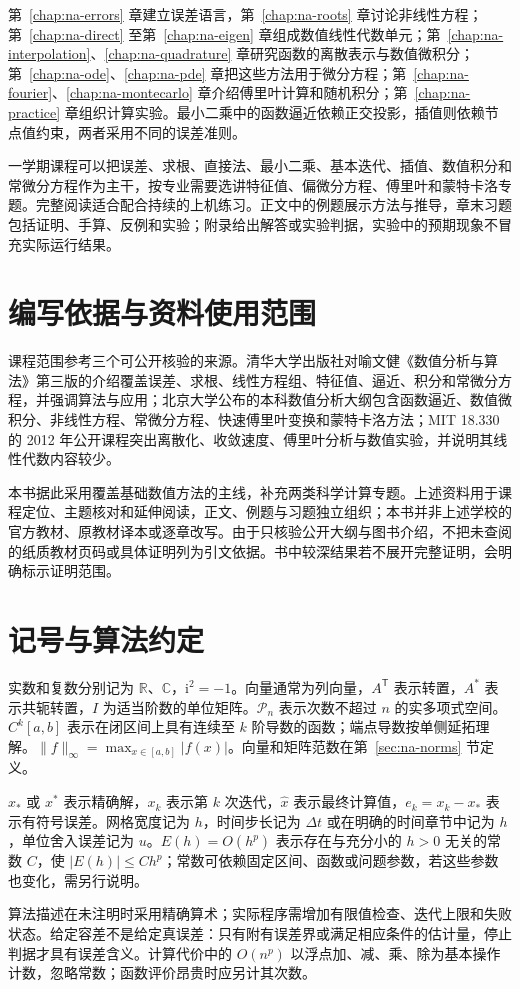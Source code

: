 第~\ref{chap:na-errors} 章建立误差语言，第~\ref{chap:na-roots} 章讨论非线性方程；第~\ref{chap:na-direct} 至第~\ref{chap:na-eigen} 章组成数值线性代数单元；第~\ref{chap:na-interpolation}、\ref{chap:na-quadrature} 章研究函数的离散表示与数值微积分；第~\ref{chap:na-ode}、\ref{chap:na-pde} 章把这些方法用于微分方程；第~\ref{chap:na-fourier}、\ref{chap:na-montecarlo} 章介绍傅里叶计算和随机积分；第~\ref{chap:na-practice} 章组织计算实验。最小二乘中的函数逼近依赖正交投影，插值则依赖节点值约束，两者采用不同的误差准则。

一学期课程可以把误差、求根、直接法、最小二乘、基本迭代、插值、数值积分和常微分方程作为主干，按专业需要选讲特征值、偏微分方程、傅里叶和蒙特卡洛专题。完整阅读适合配合持续的上机练习。正文中的例题展示方法与推导，章末习题包括证明、手算、反例和实验；附录给出解答或实验判据，实验中的预期现象不冒充实际运行结果。

\section{编写依据与资料使用范围}
课程范围参考三个可公开核验的来源。清华大学出版社对喻文健《数值分析与算法》第三版的介绍覆盖误差、求根、线性方程组、特征值、逼近、积分和常微分方程，并强调算法与应用\cite{yu2020}；北京大学公布的本科数值分析大纲包含函数逼近、数值微积分、非线性方程、常微分方程、快速傅里叶变换和蒙特卡洛方法\cite{pku-course}；MIT 18.330 的 2012 年公开课程突出离散化、收敛速度、傅里叶分析与数值实验，并说明其线性代数内容较少\cite{mit-syllabus,mit-notes}。

本书据此采用覆盖基础数值方法的主线，补充两类科学计算专题。上述资料用于课程定位、主题核对和延伸阅读，正文、例题与习题独立组织；本书并非上述学校的官方教材、原教材译本或逐章改写。由于只核验公开大纲与图书介绍，不把未查阅的纸质教材页码或具体证明列为引文依据。书中较深结果若不展开完整证明，会明确标示证明范围。

\section{记号与算法约定}
实数和复数分别记为 $\mathbb R$、$\mathbb C$，$\mathrm i^2=-1$。向量通常为列向量，$A^{\mathsf T}$ 表示转置，$A^*$ 表示共轭转置，$I$ 为适当阶数的单位矩阵。$\mathcal P_n$ 表示次数不超过 $n$ 的实多项式空间。$C^k[a,b]$ 表示在闭区间上具有连续至 $k$ 阶导数的函数；端点导数按单侧延拓理解。$\|f\|_\infty=\max_{x\in[a,b]}|f(x)|$。向量和矩阵范数在第~\ref{sec:na-norms} 节定义。

$x_*$ 或 $x^*$ 表示精确解，$x_k$ 表示第 $k$ 次迭代，$\widehat x$ 表示最终计算值，$e_k=x_k-x_*$ 表示有符号误差。网格宽度记为 $h$，时间步长记为 $\Delta t$ 或在明确的时间章节中记为 $h$，单位舍入误差记为 $u$。$E(h)=O(h^p)$ 表示存在与充分小的 $h>0$ 无关的常数 $C$，使 $|E(h)|\le Ch^p$；常数可依赖固定区间、函数或问题参数，若这些参数也变化，需另行说明。

算法描述在未注明时采用精确算术；实际程序需增加有限值检查、迭代上限和失败状态。给定容差不是给定真误差：只有附有误差界或满足相应条件的估计量，停止判据才具有误差含义。计算代价中的 $O(n^p)$ 以浮点加、减、乘、除为基本操作计数，忽略常数；函数评价昂贵时应另计其次数。

